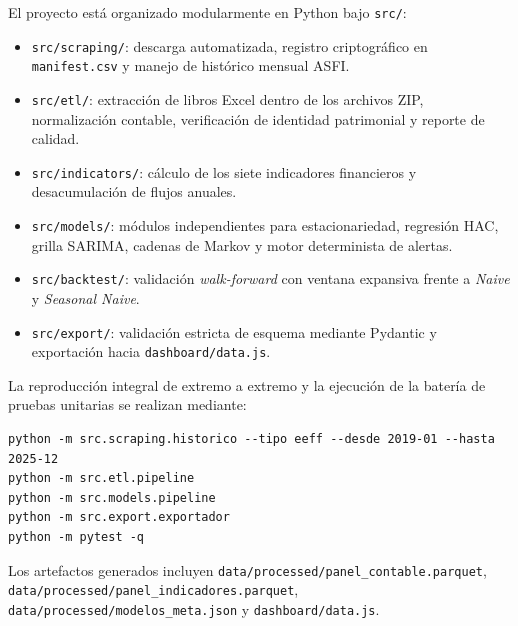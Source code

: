 \documentclass[11pt,letterpaper]{article}
\begin{document}
El proyecto está organizado modularmente en Python bajo \texttt{src/}:
\begin{itemize}[leftmargin=1.5em]
  \item \texttt{src/scraping/}: descarga automatizada, registro criptográfico en \texttt{manifest.csv} y manejo de histórico mensual ASFI.
  \item \texttt{src/etl/}: extracción de libros Excel dentro de los archivos ZIP, normalización contable, verificación de identidad patrimonial y reporte de calidad.
  \item \texttt{src/indicators/}: cálculo de los siete indicadores financieros y desacumulación de flujos anuales.
  \item \texttt{src/models/}: módulos independientes para estacionariedad, regresión HAC, grilla SARIMA, cadenas de Markov y motor determinista de alertas.
  \item \texttt{src/backtest/}: validación \emph{walk-forward} con ventana expansiva frente a \emph{Naive} y \emph{Seasonal Naive}.
  \item \texttt{src/export/}: validación estricta de esquema mediante Pydantic y exportación hacia \texttt{dashboard/data.js}.
\end{itemize}

La reproducción integral de extremo a extremo y la ejecución de la batería de pruebas unitarias se realizan mediante:
\begin{verbatim}
python -m src.scraping.historico --tipo eeff --desde 2019-01 --hasta 2025-12
python -m src.etl.pipeline
python -m src.models.pipeline
python -m src.export.exportador
python -m pytest -q
\end{verbatim}

Los artefactos generados incluyen \texttt{data/processed/panel\_contable.parquet}, \texttt{data/processed/panel\_indicadores.parquet}, \texttt{data/processed/modelos\_meta.json} y \texttt{dashboard/data.js}.
\end{document}
